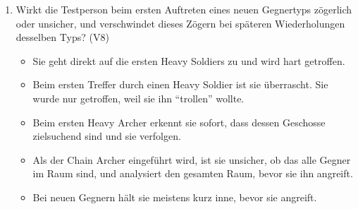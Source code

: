 \documentclass[../Main.tex]{subfiles}
\begin{document}
\begin{enumerate}[label=\textbf{B\arabic*}, leftmargin=1.5cm, itemsep=0.8em, resume]
    \item Wirkt die Testperson beim ersten Auftreten eines neuen Gegnertyps zögerlich oder unsicher, und verschwindet dieses Zögern bei späteren Wiederholungen desselben Typs? \hfill (V8)
        \begin{itemize}[nosep]
            \item Sie geht direkt auf die ersten Heavy Soldiers zu und wird hart getroffen.
            \item Beim ersten Treffer durch einen Heavy Soldier ist sie überrascht. Sie wurde nur getroffen, weil sie ihn \enquote{trollen} wollte.
            \item Beim ersten Heavy Archer erkennt sie sofort, dass dessen Geschosse zielsuchend sind und sie verfolgen.
            \item Als der Chain Archer eingeführt wird, ist sie unsicher, ob das alle Gegner im Raum sind, und analysiert den gesamten Raum, bevor sie ihn angreift.
            \item Bei neuen Gegnern hält sie meistens kurz inne, bevor sie angreift.
        \end{itemize}
\end{enumerate}
\end{document}
